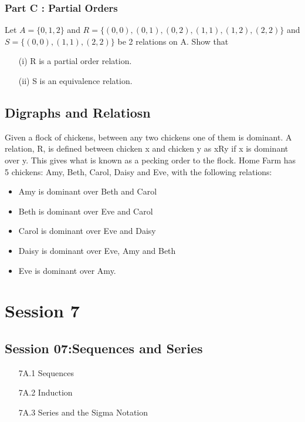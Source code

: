 \documentclass[]{report}
\begin{document}
\subsection*{Part C : Partial Orders}

Let $A=\{0,1,2\}$ and $R=\{ (0,0),(0,1),(0,2),(1,1), (1,2), (2,2)\}$
and $S=\{(0,0),(1,1),(2,2)\}$ be 2 relations on A. Show that

\begin{itemize}
	\item[(i)] R is a partial order relation.
	\item[(ii)] S is an equivalence relation.
\end{itemize}



\section{Digraphs and Relatiosn}
Given a flock of chickens, between any two chickens one of them is
dominant. A relation, R, is defined between chicken x and chicken y as xRy if x is
dominant over y. This gives what is known as a pecking order to the flock. Home
Farm has 5 chickens: Amy, Beth, Carol, Daisy and Eve, with the following relations:

\begin{itemize}
	\item Amy is dominant over Beth and Carol
	\item Beth is dominant over Eve and Carol
	\item Carol is dominant over Eve and Daisy
	\item Daisy is dominant over Eve, Amy and Beth
	\item Eve is dominant over Amy.
\end{itemize}

\newpage

\chapter{Session 7}
	
	
				\section*{Session 07:Sequences and Series}
				\begin{itemize}
					\item[7A.1] Sequences
					\item[7A.2] Induction
					\item[7A.3] Series and the Sigma Notation
				\end{itemize}
				
\end{document}

